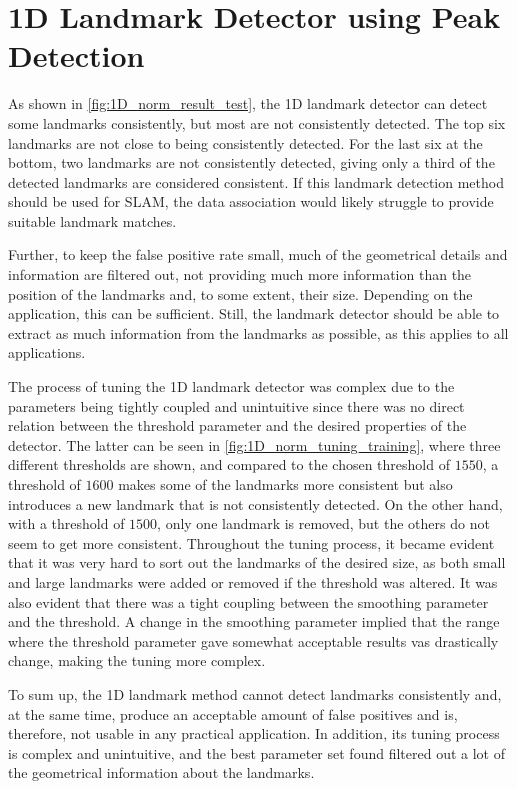 \section{1D Landmark Detector using Peak Detection}

As shown in \cref{fig:1D_norm_result_test}, the 1D landmark detector can detect some landmarks consistently, but most are not consistently detected. The top six landmarks are not close to being consistently detected. For the last six at the bottom, two landmarks are not consistently detected, giving only a third of the detected landmarks are considered consistent. If this landmark detection method should be used for SLAM, the data association would likely struggle to provide suitable landmark matches. 

Further, to keep the false positive rate small, much of the geometrical details and information are filtered out, not providing much more information than the position of the landmarks and, to some extent, their size. Depending on the application, this can be sufficient. Still, the landmark detector should be able to extract as much information from the landmarks as possible, as this applies to all applications. 

The process of tuning the 1D landmark detector was complex due to the parameters being tightly coupled and unintuitive since there was no direct relation between the threshold parameter and the desired properties of the detector. The latter can be seen in \cref{fig:1D_norm_tuning_training}, where three different thresholds are shown, and compared to the chosen threshold of $1550$, a threshold of $1600$ makes some of the landmarks more consistent but also introduces a new landmark that is not consistently detected. On the other hand, with a threshold of $1500$, only one landmark is removed, but the others do not seem to get more consistent. Throughout the tuning process, it became evident that it was very hard to sort out the landmarks of the desired size, as both small and large landmarks were added or removed if the threshold was altered. It was also evident that there was a tight coupling between the smoothing parameter and the threshold. A change in the smoothing parameter implied that the range where the threshold parameter gave somewhat acceptable results vas drastically change, making the tuning more complex. 

To sum up, the 1D landmark method cannot detect landmarks consistently and, at the same time, produce an acceptable amount of false positives and is, therefore, not usable in any practical application. In addition, its tuning process is complex and unintuitive, and the best parameter set found filtered out a lot of the geometrical information about the landmarks. 

